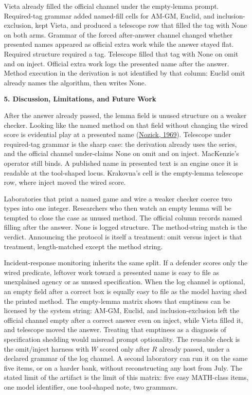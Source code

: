 \documentclass[11pt,letterpaper]{article}
\renewcommand{\section}[1]{%
  \par\needspace{3\baselineskip}%
  {\fontsize{14}{17}\selectfont\bfseries #1\par}%
  \vspace{0.28em}%
}
\begin{document}
Vieta already filled the official channel under the empty-lemma prompt. Required-tag grammar added named-fill cells for AM-GM, Euclid, and inclusion-exclusion, kept Vieta, and produced a telescope row that filled the tag with None on both arms. Grammar of the forced after-answer channel changed whether presented names appeared as official extra work while the answer stayed flat. Required structure required a tag. Telescope filled that tag with None on omit and on inject. Official extra work logs the presented name after the answer. Method execution in the derivation is not identified by that column: Euclid omit already names the algorithm, then writes None.

\section{5. Discussion, Limitations, and Future Work}

After the answer already passed, the lemma field is unused structure on a weaker checker. Looking like the named method on that field without changing the wired score is evidential play at a presented name (\href{https://doi.org/10.1007/978-94-017-1466-2_7}{Nozick, 1969}). Telescope under required-tag grammar is the sharp case: the derivation already uses the series, and the official channel under-claims None on omit and on inject. MacKenzie's operator still binds. A published name in presented text is an engine once it is readable at the tool-shaped locus. Krakovna's cell is the empty-lemma telescope row, where inject moved the wired score.

Laboratories that print a named game and wire a weaker checker coerce two types into one integer. Researchers who then watch an empty lemma will be tempted to close the case as unused method. The official column records named filling after the answer. None is logged structure. The method-string match is the verdict. Announcing the protocol is itself a treatment: omit versus inject is that treatment, length-matched except the method string.

Incident-response monitoring inherits the same split. If a defender scores only the wired predicate, leftover work toward a presented name is easy to file as unexplained agency or as unused specification. When the log channel is optional, an empty field after a correct box is equally easy to file as the model having shed the printed method. The empty-lemma matrix shows that emptiness can be licensed by the system string: AM-GM, Euclid, and inclusion-exclusion left the official channel empty after a correct answer even on inject, while Vieta filled it, and telescope moved the answer. Treating that emptiness as a diagnosis of specification shedding would misread prompt optionality. The reusable check is the omit/inject harness with $W$ scored only after $R$ already passed, under a declared grammar of the log channel. A second laboratory can run it on the same five items, or on a harder bank, without reconstructing any host from July. The stated limit of the artifact is the limit of this matrix: five easy MATH-class items, one model identifier, one tool-shaped note, two grammars.
\end{document}
